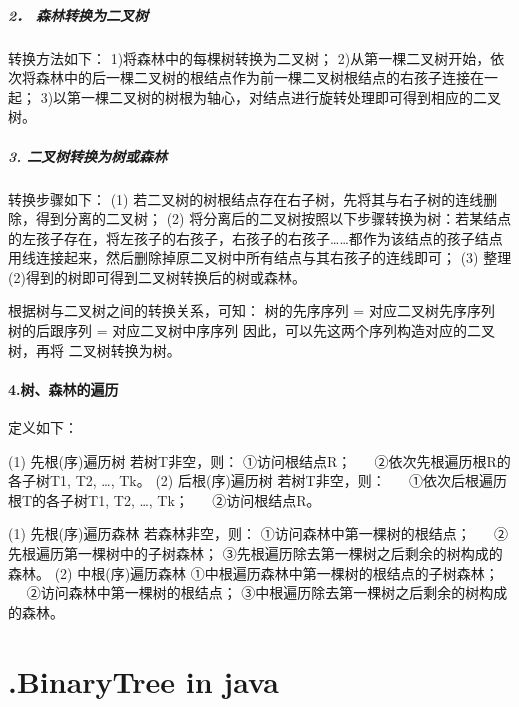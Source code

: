 \documentclass[UTF8]{ctexart}
\begin{document}
\subparagraph{2． 森林转换为二叉树}
转换方法如下：
	1)将森林中的每棵树转换为二叉树；
	2)从第一棵二叉树开始，依次将森林中的后一棵二叉树的根结点作为前一棵二叉树根结点的右孩子连接在一起；
	3)以第一棵二叉树的树根为轴心，对结点进行旋转处理即可得到相应的二叉树。


\subparagraph{3. 二叉树转换为树或森林}
转换步骤如下：
	(1) 若二叉树的树根结点存在右子树，先将其与右子树的连线删除，得到分离的二叉树；
	(2) 将分离后的二叉树按照以下步骤转换为树：若某结点的左孩子存在，将左孩子的右孩子，右孩子的右孩子……都作为该结点的孩子结点用线连接起来，然后删除掉原二叉树中所有结点与其右孩子的连线即可；
	(3) 整理(2)得到的树即可得到二叉树转换后的树或森林。

根据树与二叉树之间的转换关系，可知：
树的先序序列 = 对应二叉树先序序列
树的后跟序列 = 对应二叉树中序序列
因此，可以先这两个序列构造对应的二叉树，再将
二叉树转换为树。


\paragraph{4.树、森林的遍历}

定义如下：

(1) 先根(序)遍历树
		若树T非空，则：
		①访问根结点R；
　		②依次先根遍历根R的各子树T1, T2, …, Tk。
(2) 后根(序)遍历树
		若树T非空，则：
　		①依次后根遍历根T的各子树T1, T2, …, Tk；
　		②访问根结点R。

	(1) 先根(序)遍历森林
		若森林非空，则：
		①访问森林中第一棵树的根结点；
　		②先根遍历第一棵树中的子树森林；
		③先根遍历除去第一棵树之后剩余的树构成的森林。
	(2) 中根(序)遍历森林
		①中根遍历森林中第一棵树的根结点的子树森林；
　		②访问森林中第一棵树的根结点；
		③中根遍历除去第一棵树之后剩余的树构成的森林。





\newpage
\section*{.BinaryTree in java}

\end{document}
